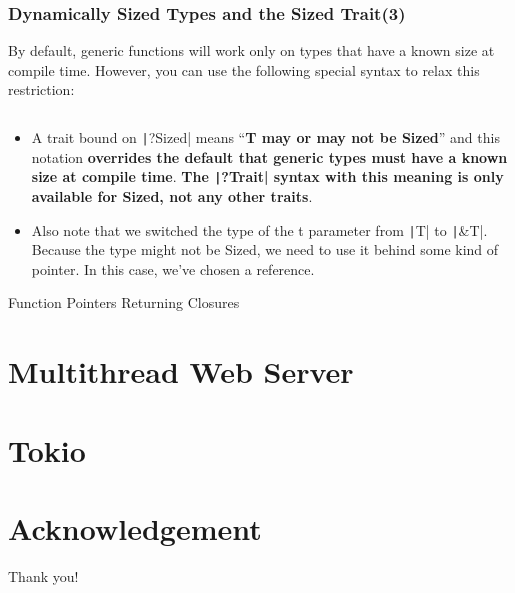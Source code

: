 \documentclass{beamer}
\begin{document}
\begin{frame}[fragile]
	\frametitle{Dynamically Sized Types and the Sized Trait(3)}
	By default, generic functions will work only on types that have a known size at compile time. However, you can use the following special syntax to relax this restriction:
	
	\inputminted{rust}{./code/type7.rs}
	
	\scriptsize
	\begin{itemize}
		\item A trait bound on  \texttt|?Sized| means “\textbf{T may or may not be Sized}” and this notation \textbf{overrides the default that generic types must have a known size at compile time}. \textbf{The \texttt|?Trait| syntax with this meaning is only available for Sized, not any other traits}.
		\item 	Also note that we switched the type of the t parameter from \texttt|T| to \texttt|&T|. Because the type might not be Sized, we need to use it behind some kind of pointer. In this case, we’ve chosen a reference.
	\end{itemize}
	
\end{frame}


Function Pointers
Returning Closures

\section{Multithread Web Server}
\section{Tokio}

\section*{Acknowledgement}
\begin{frame}
	\Huge{\centerline{Thank you!}}
\end{frame}
\end{document}
